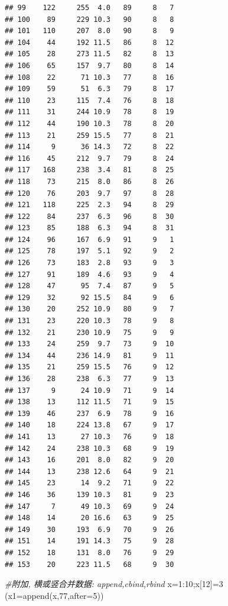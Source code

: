 \documentclass[
]{book}
\newenvironment{Shaded}{\begin{snugshade}}{\end{snugshade}}
\newcommand{\AttributeTok}[1]{\textcolor[rgb]{0.77,0.63,0.00}{#1}}
\newcommand{\CommentTok}[1]{\textcolor[rgb]{0.56,0.35,0.01}{\textit{#1}}}
\newcommand{\DecValTok}[1]{\textcolor[rgb]{0.00,0.00,0.81}{#1}}
\newcommand{\FunctionTok}[1]{\textcolor[rgb]{0.00,0.00,0.00}{#1}}
\newcommand{\NormalTok}[1]{#1}
\newcommand{\OtherTok}[1]{\textcolor[rgb]{0.56,0.35,0.01}{#1}}
\newcommand{\SpecialCharTok}[1]{\textcolor[rgb]{0.00,0.00,0.00}{#1}}
\begin{document}
\begin{verbatim}
## 99    122     255  4.0   89     8   7
## 100    89     229 10.3   90     8   8
## 101   110     207  8.0   90     8   9
## 104    44     192 11.5   86     8  12
## 105    28     273 11.5   82     8  13
## 106    65     157  9.7   80     8  14
## 108    22      71 10.3   77     8  16
## 109    59      51  6.3   79     8  17
## 110    23     115  7.4   76     8  18
## 111    31     244 10.9   78     8  19
## 112    44     190 10.3   78     8  20
## 113    21     259 15.5   77     8  21
## 114     9      36 14.3   72     8  22
## 116    45     212  9.7   79     8  24
## 117   168     238  3.4   81     8  25
## 118    73     215  8.0   86     8  26
## 120    76     203  9.7   97     8  28
## 121   118     225  2.3   94     8  29
## 122    84     237  6.3   96     8  30
## 123    85     188  6.3   94     8  31
## 124    96     167  6.9   91     9   1
## 125    78     197  5.1   92     9   2
## 126    73     183  2.8   93     9   3
## 127    91     189  4.6   93     9   4
## 128    47      95  7.4   87     9   5
## 129    32      92 15.5   84     9   6
## 130    20     252 10.9   80     9   7
## 131    23     220 10.3   78     9   8
## 132    21     230 10.9   75     9   9
## 133    24     259  9.7   73     9  10
## 134    44     236 14.9   81     9  11
## 135    21     259 15.5   76     9  12
## 136    28     238  6.3   77     9  13
## 137     9      24 10.9   71     9  14
## 138    13     112 11.5   71     9  15
## 139    46     237  6.9   78     9  16
## 140    18     224 13.8   67     9  17
## 141    13      27 10.3   76     9  18
## 142    24     238 10.3   68     9  19
## 143    16     201  8.0   82     9  20
## 144    13     238 12.6   64     9  21
## 145    23      14  9.2   71     9  22
## 146    36     139 10.3   81     9  23
## 147     7      49 10.3   69     9  24
## 148    14      20 16.6   63     9  25
## 149    30     193  6.9   70     9  26
## 151    14     191 14.3   75     9  28
## 152    18     131  8.0   76     9  29
## 153    20     223 11.5   68     9  30
\end{verbatim}

\begin{Shaded}
\begin{Highlighting}[]
\CommentTok{\#附加, 横或竖合并数据: append,cbind,rbind}
\NormalTok{x}\OtherTok{=}\DecValTok{1}\SpecialCharTok{:}\DecValTok{10}\NormalTok{;x[}\DecValTok{12}\NormalTok{]}\OtherTok{=}\DecValTok{3}
\NormalTok{(}\AttributeTok{x1=}\FunctionTok{append}\NormalTok{(x,}\DecValTok{77}\NormalTok{,}\AttributeTok{after=}\DecValTok{5}\NormalTok{))}
\end{Highlighting}
\end{Shaded}
\end{document}

